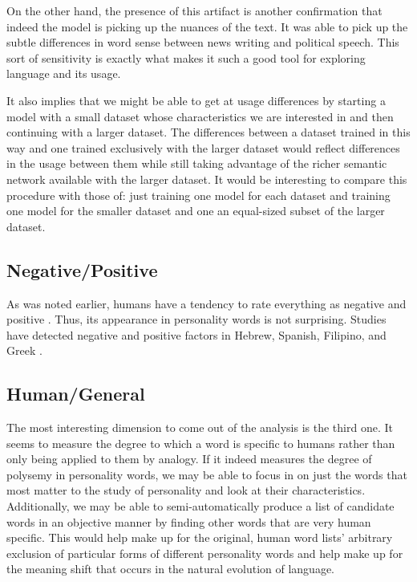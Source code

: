 On the other hand, the presence of this artifact is another confirmation that
indeed the model is picking up the nuances of the text. It was able to pick up
the subtle differences in word sense between news writing and political speech.
This sort of sensitivity is exactly what makes it such a good tool for exploring
language and its usage.

It also implies that we might be able to get at usage differences by starting a
model with a small dataset whose characteristics we are interested in and then
continuing with a larger dataset. The differences between a dataset trained in
this way and one trained exclusively with the larger dataset would reflect 
differences in the usage between them while still taking advantage of the richer
semantic network available with the larger dataset. It would be interesting to
compare this procedure with those of: just training one model for each dataset
and training one model for the smaller dataset and one an equal-sized subset of
the larger dataset.

\subsection{Negative/Positive}

As was noted earlier, humans have a tendency to rate everything as negative and
positive \citep{Samsonovich2010}. Thus, its appearance in personality words
is not surprising. Studies have detected negative and positive factors
in Hebrew, Spanish, Filipino, and Greek \citep[p. 134]{DeRaad2009}. 

\subsection{Human/General}

The most interesting dimension to come out of the analysis is the third one.
It seems to measure the degree to which a word is specific to humans rather than
only being applied to them by analogy. 
If it indeed measures the degree of polysemy in personality words, we may be 
able to focus in on just the words that most matter to the study of personality
and look at their characteristics. Additionally, we may be able to 
semi-automatically produce a list of candidate words in an objective manner by
finding other words that are very human specific. This would help make up for
the original, human word lists' arbitrary exclusion of particular forms of 
different
personality words and help make up for the meaning shift that occurs in the 
natural evolution of language.

